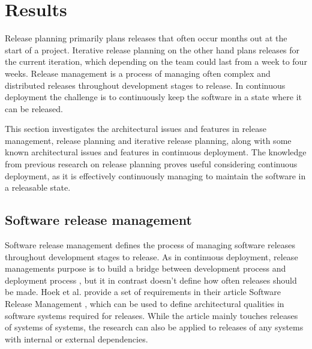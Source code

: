 \documentclass[conference]{IEEEtran}
\begin{document}
\section{Results} %
Release planning primarily plans releases that often occur months out at the start of a project. Iterative release planning on the other hand plans releases for the current iteration, which depending on the team could last from a week to four weeks. Release management is a process of managing often complex and distributed releases throughout development stages to release. In continuous deployment the challenge is to continuously keep the software in a state where it can be released. 

This section investigates the architectural issues and features in release management, release planning and iterative release planning, along with some known architectural issues and features in continuous deployment. The knowledge from previous research on release planning proves useful considering continuous deployment, as it is effectively continuously managing to maintain the software in a releasable state.

\subsection{Software release management}

Software release management defines the process of managing software releases throughout development stages to release. As in continuous deployment, release managements purpose is to build a bridge between development process and deployment process \cite{van1997software}, but it in contrast doesn't define how often releases should be made. Hoek et al. provide a set of requirements in their article Software Release Management \cite{van1997software}, which can be used to define architectural qualities in software systems required for releases. While the article mainly touches releases of systems of systems, the research can also be applied to releases of any systems with internal or external dependencies.
\end{document}
